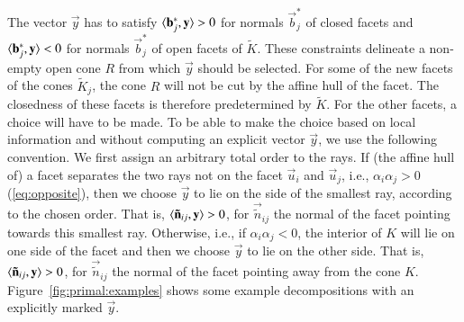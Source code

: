 The vector $\vec y$ has to satisfy $\sp{b^*_j}y > 0$ for normals $\vec b^*_j$
of closed facets and $\sp{b^*_j}y < 0$ for normals $\vec b^*_j$ of open facets of
$\tilde K$.
These constraints delineate a non-empty open cone $R$ from which
$\vec y$ should be selected.  For some of the new facets of the cones
$\tilde K_j$, the cone $R$ will not be cut by the affine hull of the facet.
The closedness of these facets is therefore predetermined by $\tilde K$.
For the other facets, a choice will have to be made.
To be able to make the choice based on local information and without
computing an explicit vector $\vec y$, we use the following convention.
We first assign an arbitrary total order to the rays.
If (the affine hull of) a facet separates the two rays not on the facet $\vec u_i$
and $\vec u_j$, i.e., $\alpha_i \alpha_j > 0$ (\ref{eq:opposite}), then
we choose $\vec y$ to lie on the side of the smallest ray, according
to the chosen order.
That is, $\sp{{\tilde n}_{ij}}y > 0$, for
$\vec {\tilde n}_{ij}$ the normal of the facet pointing towards this smallest ray.
Otherwise, i.e., if $\alpha_i \alpha_j < 0$,
the interior of $K$ will lie on one side
of the facet and then we choose $\vec y$ to lie on the other side.
That is, $\sp{{\tilde n}_{ij}}y > 0$, for
$\vec {\tilde n}_{ij}$ the normal of the facet pointing away from the cone $K$.
Figure~\ref{fig:primal:examples} shows some example decompositions with
an explicitly marked $\vec y$.

